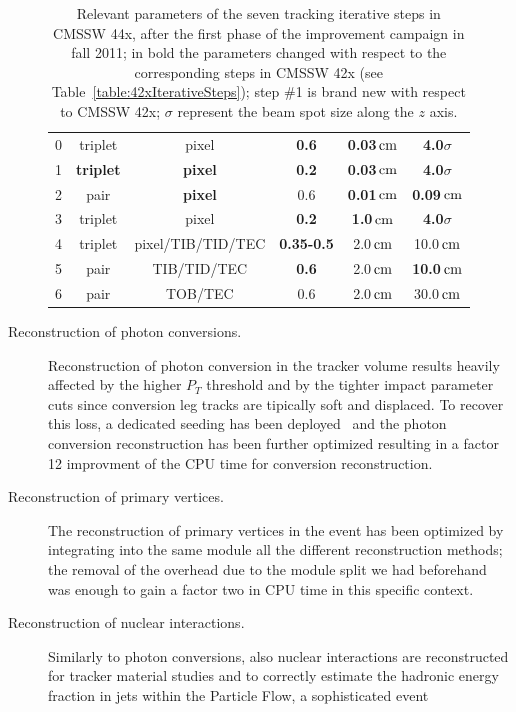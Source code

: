 \begin{description}
\begin{table}[b]
\begin{tabular}{cccccc}
  0 & triplet             & pixel & {\bf 0.6} & {\bf 0.03}$\rm \, cm$ & {\bf 4.0}$\sigma$ \\
  1 & {\bf triplet} & {\bf pixel} & {\bf 0.2} & {\bf 0.03}$\rm \, cm$ & {\bf 4.0}$\sigma$ \\
  2 & pair          & {\bf pixel} & 0.6       & {\bf 0.01}$\rm \, cm$ & {\bf 0.09}$\rm \, cm$ \\
  3 & triplet             & pixel & {\bf 0.2} & {\bf 1.0}$\rm \, cm$ & {\bf 4.0}$\sigma$ \\
  4 & triplet & pixel/TIB/TID/TEC & {\bf 0.35-0.5} & 2.0$\rm \, cm$ & 10.0$\rm \, cm$ \\
  5 & pair    & TIB/TID/TEC       & {\bf 0.6} & 2.0$\rm \, cm$ & {\bf 10.0}$\rm \, cm$ \\
  6 & pair    & TOB/TEC           & 0.6       & 2.0$\rm \, cm$ & 30.0$\rm \, cm$ \\
\end{tabular}
  \caption{Relevant parameters of the seven tracking iterative steps in
    CMSSW 44x, after the first phase of the improvement campaign in
    fall 2011; in bold the parameters changed with respect to the
    corresponding steps in CMSSW 42x (see
    Table~\ref{table:42xIterativeSteps}); step \#1 is brand new with
    respect to CMSSW 42x; $\sigma$ represent the beam spot size
    along the $z$ axis.}
  \label{table:44xIterativeSteps}
\end{table}
%
\item[Reconstruction of photon conversions.] Reconstruction of photon
  conversion in the tracker volume results heavily affected by the
  higher $P_T$ threshold and by the tighter impact parameter cuts
  since conversion leg tracks are tipically soft and displaced. To
  recover this loss, a dedicated seeding has been
  deployed~\cite{posterConv} and the photon conversion reconstruction
  has been further optimized resulting in a factor 12 improvment of
  the CPU time for conversion reconstruction.
\item[Reconstruction of primary vertices.] The reconstruction of
  primary vertices in the event has been optimized by integrating into
  the same module all the different reconstruction methods; the
  removal of the overhead due to the module split we had beforehand
  was enough to gain a factor two in CPU time in this specific context.
\item[Reconstruction of nuclear interactions.] Similarly to photon
  conversions, also nuclear interactions are reconstructed for tracker
  material studies and to correctly estimate the hadronic energy
  fraction in jets within the Particle Flow, a sophisticated event

\end{description}
